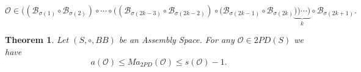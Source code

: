 \documentclass[10pt,a4paper]{amsart}
\newtheorem{theorem}{Theorem}
\begin{document}
        \begin{equation}\label{2piece2k1}
            \mathscr{O} \in ((\mathscr{B}_{\sigma(1)} \circ \mathscr{B}_{\sigma(2)}) \circ \cdots \circ ((\mathscr{B}_{\sigma(2k-3)} \circ \mathscr{B}_{\sigma(2k-2)}) \circ (\mathscr{B}_{\sigma(2k-1)} \circ \mathscr{B}_{\sigma(2k)}\underbrace{)) \cdots )}_{k} \circ \mathscr{B}_{\sigma(2k+1)}.   
        \end{equation}

\begin{theorem}
Let $(S,\circ,BB)$ be an Assembly Space. For any $\mathscr{O} \in 2PD(S)$ we have
\begin{equation}\label{ineq2PD}
    a(\mathscr{O}) \leq Ma_{2PD}(\mathscr{O}) \leq s(\mathscr{O})-1.
\end{equation}
\end{theorem}
\end{document}
